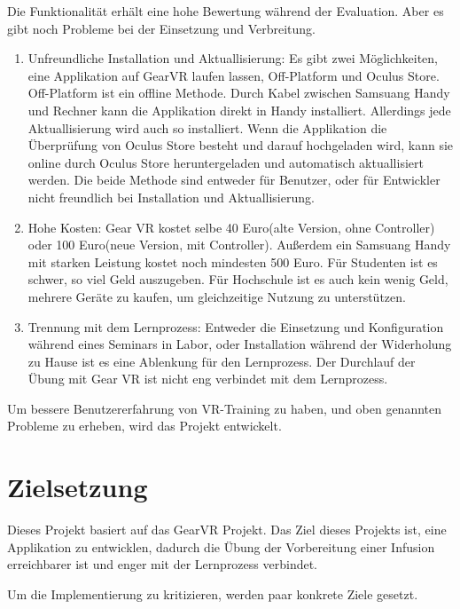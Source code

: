 Die Funktionalität erhält eine hohe Bewertung während der Evaluation. Aber es gibt noch Probleme bei der Einsetzung und Verbreitung.
\begin{enumerate}
\item Unfreundliche Installation und Aktuallisierung: Es gibt zwei Möglichkeiten, eine Applikation auf GearVR laufen lassen, Off-Platform und Oculus Store. Off-Platform ist ein offline Methode. Durch Kabel zwischen Samsuang Handy und Rechner kann die Applikation direkt in Handy installiert. Allerdings jede Aktuallisierung wird auch so installiert. Wenn die Applikation die Überprüfung von Oculus Store besteht und darauf hochgeladen wird, kann sie online durch Oculus Store heruntergeladen und automatisch aktuallisiert werden. Die beide Methode sind entweder für Benutzer, oder für Entwickler nicht freundlich bei Installation und Aktuallisierung.
\item Hohe Kosten: Gear VR kostet selbe 40 Euro(alte Version, ohne Controller) oder 100 Euro(neue Version, mit Controller). Außerdem ein Samsuang Handy mit starken Leistung kostet noch mindesten 500 Euro. Für Studenten ist es schwer, so viel Geld auszugeben. Für Hochschule ist es auch kein wenig Geld, mehrere Geräte zu kaufen, um gleichzeitige Nutzung zu unterstützen.
\item Trennung mit dem Lernprozess: Entweder die Einsetzung und Konfiguration während eines Seminars in Labor, oder Installation während der Widerholung zu Hause ist es eine Ablenkung für den Lernprozess. Der Durchlauf der Übung mit Gear VR ist nicht eng verbindet mit dem Lernprozess.
\end{enumerate}

Um bessere Benutzererfahrung von VR-Training zu haben, und oben genannten Probleme zu erheben, wird das Projekt entwickelt.

\section{Zielsetzung}

Dieses Projekt basiert auf das GearVR Projekt. Das Ziel dieses Projekts ist, eine Applikation zu entwicklen, dadurch die Übung der Vorbereitung einer Infusion erreichbarer ist und enger mit der Lernprozess verbindet.

Um die Implementierung zu kritizieren, werden paar konkrete Ziele gesetzt.

